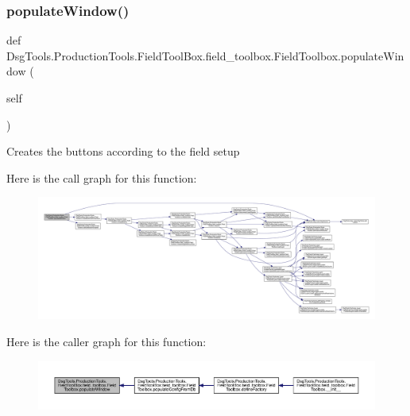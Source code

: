 \subsubsection{\texorpdfstring{populate\+Window()}{populateWindow()}}
{\footnotesize\ttfamily def Dsg\+Tools.\+Production\+Tools.\+Field\+Tool\+Box.\+field\+\_\+toolbox.\+Field\+Toolbox.\+populate\+Window (\begin{DoxyParamCaption}\item[{}]{self }\end{DoxyParamCaption})}

\begin{DoxyVerb}Creates the buttons according to the field setup
\end{DoxyVerb}
 Here is the call graph for this function\+:
\nopagebreak
\begin{figure}[H]
\begin{center}
\leavevmode
\includegraphics[width=350pt]{class_dsg_tools_1_1_production_tools_1_1_field_tool_box_1_1field__toolbox_1_1_field_toolbox_a8faeaf01b5665f0b0c37fbc77024ab1c_cgraph}
\end{center}
\end{figure}
Here is the caller graph for this function\+:
\nopagebreak
\begin{figure}[H]
\begin{center}
\leavevmode
\includegraphics[width=350pt]{class_dsg_tools_1_1_production_tools_1_1_field_tool_box_1_1field__toolbox_1_1_field_toolbox_a8faeaf01b5665f0b0c37fbc77024ab1c_icgraph}
\end{center}
\end{figure}
\mbox{\label{class_dsg_tools_1_1_production_tools_1_1_field_tool_box_1_1field__toolbox_1_1_field_toolbox_a55f4b1700bd0416f59d955f57f1f9744}} 
